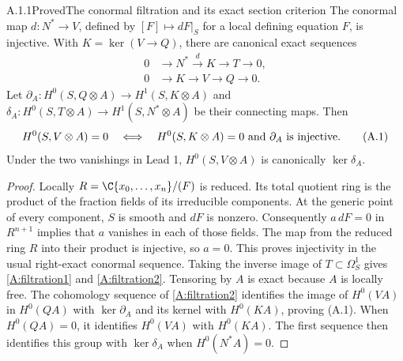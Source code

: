 \begin{statement}{A.1.1}{Proved}{The conormal filtration and its exact section criterion}
The conormal map $d:N^*\to V$, defined by $[F]\mapsto dF|_S$ for a local defining equation $F$, is injective. With $K=\ker(V\to Q)$, there are canonical exact sequences
\begin{align}
0&\longrightarrow N^*\xrightarrow{d}K\longrightarrow T\longrightarrow0,
\label{A:filtration1}\\
0&\longrightarrow K\longrightarrow V\longrightarrow Q\longrightarrow0.
\label{A:filtration2}
\end{align}
Let $\partial_A:H^0(S,Q\otimes A)\to H^1(S,K\otimes A)$ and $\delta_A:H^0(S,T\otimes A)\to H^1(S,N^*\otimes A)$ be their connecting maps. Then
\[
 H^0(S,V\otimes A)=0
 \quad\Longleftrightarrow\quad
 H^0(S,K\otimes A)=0\ \hbox{and}\ \partial_A\hbox{ is injective}.
\tag{A.1}
\]
Under the two vanishings in Lead 1, $H^0(S,V\otimes A)$ is canonically $\ker\delta_A$.
\end{statement}
\begin{proof}
Locally $R=\C\{x_0,\ldots,x_n\}/(F)$ is reduced. Its total quotient ring is the product of the fraction fields of its irreducible components. At the generic point of every component, $S$ is smooth and $dF$ is nonzero. Consequently $a\,dF=0$ in $R^{n+1}$ implies that $a$ vanishes in each of those fields. The map from the reduced ring $R$ into their product is injective, so $a=0$. This proves injectivity in the usual right-exact conormal sequence. Taking the inverse image of $T\subset\Omega_S^1$ gives \eqref{A:filtration1} and \eqref{A:filtration2}. Tensoring by $A$ is exact because $A$ is locally free. The cohomology sequence of \eqref{A:filtration2} identifies the image of $H^0(VA)$ in $H^0(QA)$ with $\ker\partial_A$ and its kernel with $H^0(KA)$, proving (A.1). When $H^0(QA)=0$, it identifies $H^0(VA)$ with $H^0(KA)$. The first sequence then identifies this group with $\ker\delta_A$ when $H^0(N^*A)=0$.
\end{proof}



